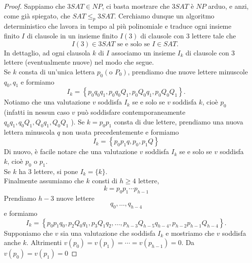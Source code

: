 \begin{proof}
    Sappiamo che $3 S A T \in N P$, ci basta mostrare che $3 S A T$ è $N P$
    arduo, e anzi, come già spiegato, che $S A T \leq_p 3 S A T$. Cerchiamo dunque
    un algoritmo deterministico che lavora in tempo al più polinomiale e traduce
    ogni insieme finito $I$ di clausole in un insieme finito $I(3)$ di clausole
    con 3 lettere tale che
    $$
        I(3) \in 3 S A T \text { se e solo se } I \in S A T \text {. }
    $$
    In dettaglio, ad ogni clausola $k$ di $I$ associamo un insieme $I_k$ di
    clausole con 3 lettere (eventualmente nuove) nel modo che segue.\\
    Se $k$ consta di un'unica lettera $p_0\left(\text{o } P_0\right)$, prendiamo
    due nuove lettere minuscole $q_0, q_1$ e formiamo
    $$
        I_k=\left\{p_0 q_0 q_1, p_0 q_0 Q_1, p_0 Q_0 q_1, p_0 Q_0 Q_1\right\} .
    $$
    Notiamo che una valutazione $v$ soddisfa $I_k$ se e solo se $v$ soddisfa
    $k$, cioè $p_0$ (infatti in nessun caso $v$ può soddisfare
    contemporaneamente $q_0 q_1, q_0 Q_1, Q_0 q_1, Q_0 Q_1$ ). Se $k=p_0 p_1$
    consta di due lettere, prendiamo una nuova lettera minuscola $q$ non usata
    precedentemente e formiamo
    $$
        I_k=\left\{p_0 p_1 q, p_0, p_1 Q\right\}
    $$
    Di nuovo, è facile notare che una valutazione $v$ soddisfa $I_k$ se e solo
    se $v$ soddisfa $k$, cioè $p_0$ o $p_1$.\\
    Se $k$ ha 3 lettere, si pone $I_k=\{k\}$.\\
    Finalmente assumiamo che $k$ consti di $h \geq 4$ lettere,
    $$
        k=p_0 p_1 \cdots p_{h-1}
    $$
    Prendiamo $h-3$ nuove lettere
    $$
        q_0, \ldots, q_{h-4}
    $$
    e formiamo
    $$
        I_k=\left\{p_0 p_1 q_0, p_2 Q_0 q_1, p_3 Q_1 q_2, \ldots, p_{h-3} Q_{h-5} q_{h-4}, p_{h-2} p_{h-1} Q_{h-4}\right\} .
    $$
    Supponiamo che $v$ sia una valutazione che soddisfa $I_k$ e mostriamo che
    $v$ soddisfa anche $k$. Altrimenti
    $v\left(p_0\right)=v\left(p_1\right)=\cdots=v\left(p_{h-1}\right)=0$. Da
    $v\left(p_0\right)=v\left(p_1\right)=0$


\end{proof}
